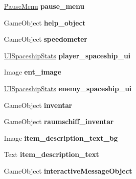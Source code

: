 \begin{DoxyCompactItemize}
\mbox{\label{class_u_i_a08a177c3c7161f0dfbf076844d6c8ceb}} 
\hyperlink{class_pause_menu}{Pause\+Menu} {\bfseries pause\+\_\+menu}
\item 
\mbox{\label{class_u_i_a0e85795e9a28af78bf1ed8d9eb205431}} 
Game\+Object {\bfseries help\+\_\+object}
\item 
\mbox{\label{class_u_i_a01f80a9e291b180990822472dd6d37f3}} 
Game\+Object {\bfseries speedometer}
\item 
\mbox{\label{class_u_i_a4d9f9301655f74aae790c4d49c29f093}} 
\hyperlink{struct_u_i_spaceship_stats}{U\+I\+Spaceship\+Stats} {\bfseries player\+\_\+spaceship\+\_\+ui}
\item 
\mbox{\label{class_u_i_a4e15d177769d293634368638e28612e9}} 
Image {\bfseries ent\+\_\+image}
\item 
\mbox{\label{class_u_i_ac9436eb8f38ff99a6eb7da436cfc07ee}} 
\hyperlink{struct_u_i_spaceship_stats}{U\+I\+Spaceship\+Stats} {\bfseries enemy\+\_\+spaceship\+\_\+ui}
\item 
\mbox{\label{class_u_i_acecd6e08ca99f6779b39c59a7e98e5cb}} 
Game\+Object {\bfseries inventar}
\item 
\mbox{\label{class_u_i_af866b3c4610c3dd2ae86c786381d7d09}} 
Game\+Object {\bfseries raumschiff\+\_\+inventar}
\item 
\mbox{\label{class_u_i_ad3eddf1f4ecfd2d2149e5a0a24e1038f}} 
Image {\bfseries item\+\_\+description\+\_\+text\+\_\+bg}
\item 
\mbox{\label{class_u_i_ae640c58b1ea72e9c65256802347924c9}} 
Text {\bfseries item\+\_\+description\+\_\+text}
\item 
\mbox{\label{class_u_i_a3f923d1aa0a5c75badbb676474984de9}} 
Game\+Object {\bfseries interactive\+Message\+Object}
\end{DoxyCompactItemize}

